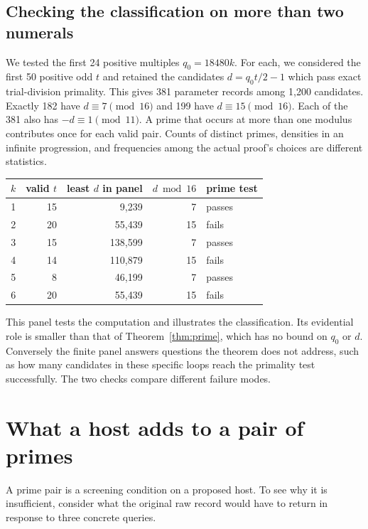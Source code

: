 \documentclass[12pt,letterpaper]{article}
\begin{document}
\subsection{Checking the classification on more than two numerals}
We tested the first 24 positive multiples $q_0=18480k$. For each, we considered the first 50 positive odd $t$ and retained the candidates $d=q_0t/2-1$ which pass exact trial-division primality. This gives 381 parameter records among 1,200 candidates. Exactly 182 have $d\equiv7\pmod{16}$ and 199 have $d\equiv15\pmod{16}$. Each of the 381 also has $-d\equiv1\pmod{11}$. A prime that occurs at more than one modulus contributes once for each valid pair. Counts of distinct primes, densities in an infinite progression, and frequencies among the actual proof's choices are different statistics.

\begin{center}\small
\begin{tabular}{@{}rrrrl@{}}\toprule
$k$ & valid $t$ & least $d$ in panel & $d\bmod16$ & prime test\\\midrule
1 &15& 9,239&7&passes\\
2 &20&55,439&15&fails\\
3 &15&138,599&7&passes\\
4 &14&110,879&15&fails\\
5 & 8&46,199&7&passes\\
6 &20&55,439&15&fails\\\bottomrule
\end{tabular}\end{center}
This panel tests the computation and illustrates the classification. Its evidential role is smaller than that of Theorem~\ref{thm:prime}, which has no bound on $q_0$ or $d$. Conversely the finite panel answers questions the theorem does not address, such as how many candidates in these specific loops reach the primality test successfully. The two checks compare different failure modes.

\section{What a host adds to a pair of primes}\label{sec:host}
A prime pair is a screening condition on a proposed host. To see why it is insufficient, consider what the original raw record would have to return in response to three concrete queries.
\end{document}
